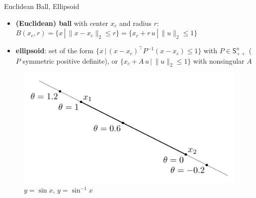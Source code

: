 \documentclass[10pt]{beamer}
\newcommand{\ds}{\displaystyle}
\theoremstyle{definition}
\begin{document}
\begin{frame}{Euclidean Ball, Ellipsoid}
\begin{itemize}
  \item {\bf (Euclidean) ball} with center $x_c$ and radius $r$: \\ $\ds B(x_c, r) = \{x\,|\,\|x - x_c\|_2\leqslant r\} = \{x_c + r\,u\,|\,\|u\|_2 \leqslant 1\}$
  \item {\bf ellipsoid}: set of the form $\ds\{x\,|\,(x - x_c)^\top P^{-1}(x - x_c)\leqslant 1\}$ with $P\in\mathsf{S}_{++}^n$ ($P$ symmetric positive definite), or $\ds\{x_c + A\,u\,|\,\|u\|_2 \leqslant 1\}$ with nonsingular $A$
\end{itemize}

\begin{figure}[!htbp]
  \centering
  \includegraphics[scale=0.9,page=9]{fig/note06/02.pdf}
  \caption{$y = \sin x$, $y = \sin^{-1} x$}
\end{figure}

\end{frame}
\end{document}
